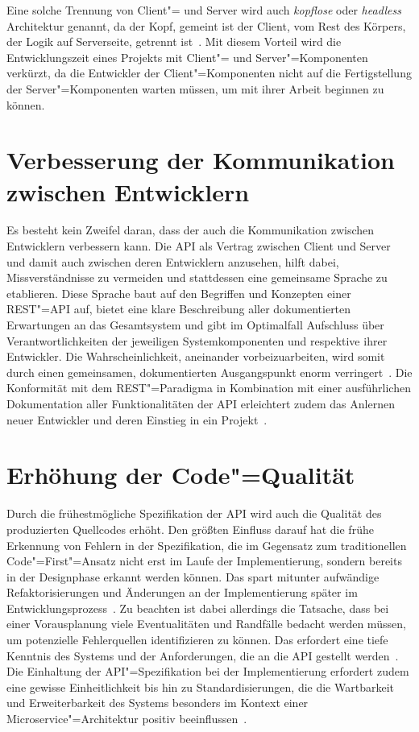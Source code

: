 Eine solche Trennung von Client"= und Server wird auch \emph{kopflose} oder \emph{\foreignlanguage{american}{headless}} Architektur genannt, da der Kopf, gemeint ist der Client, vom Rest des Körpers, der Logik auf Serverseite, getrennt ist~\cite[5]{kul23}.
Mit diesem Vorteil wird die Entwicklungszeit eines Projekts mit Client"= und Server"=Komponenten verkürzt, da die Entwickler der Client"=Komponenten nicht auf die Fertigstellung der Server"=Komponenten warten müssen, um mit ihrer Arbeit beginnen zu können.

\section{Verbesserung der Kommunikation zwischen Entwicklern}
Es besteht kein Zweifel daran, dass der \AFA auch die Kommunikation zwischen Entwicklern verbessern kann.
Die \ac{API} als Vertrag zwischen Client und Server und damit auch zwischen deren Entwicklern anzusehen, hilft dabei, Missverständnisse zu vermeiden und stattdessen eine gemeinsame Sprache zu etablieren. Diese Sprache baut auf den Begriffen und Konzepten einer \acs{REST}"=\acs{API} auf, bietet eine klare Beschreibung aller dokumentierten Erwartungen an das Gesamtsystem und gibt im Optimalfall Aufschluss über Verantwortlichkeiten der jeweiligen Systemkomponenten und respektive ihrer Entwickler.
Die Wahrscheinlichkeit, aneinander vorbeizuarbeiten, wird somit durch einen gemeinsamen, dokumentierten Ausgangspunkt enorm verringert~\cite[1628]{cha21}.
Die Konformität mit dem \ac{REST}"=Paradigma in Kombination mit einer ausführlichen Dokumentation aller Funktionalitäten der \ac{API} erleichtert zudem das Anlernen neuer Entwickler und deren Einstieg in ein Projekt~\cite[355]{de23}.

\section{Erhöhung der Code"=Qualität}
Durch die frühestmögliche Spezifikation der \ac{API} wird auch die Qualität des produzierten Quellcodes erhöht.
Den größten Einfluss darauf hat die frühe Erkennung von Fehlern in der Spezifikation, die im Gegensatz zum traditionellen Code"=First"=Ansatz nicht erst im Laufe der Implementierung, sondern bereits in der Designphase erkannt werden können.
Das spart mitunter aufwändige Refaktorisierungen und Änderungen an der Implementierung später im Entwicklungsprozess~\cite{vol22}.
Zu beachten ist dabei allerdings die Tatsache, dass bei einer Vorausplanung viele Eventualitäten und Randfälle bedacht werden müssen, um potenzielle Fehlerquellen identifizieren zu können. Das erfordert eine tiefe Kenntnis des Systems und der Anforderungen, die an die \ac{API} gestellt werden~\cite[362]{de23}. %
Die Einhaltung der \ac{API}"=Spezifikation bei der Implementierung erfordert zudem eine gewisse Einheitlichkeit bis hin zu Standardisierungen, die die Wartbarkeit und Erweiterbarkeit des Systems besonders im Kontext einer Microservice"=Architektur positiv beeinflussen~\cite[1628]{cha21}.